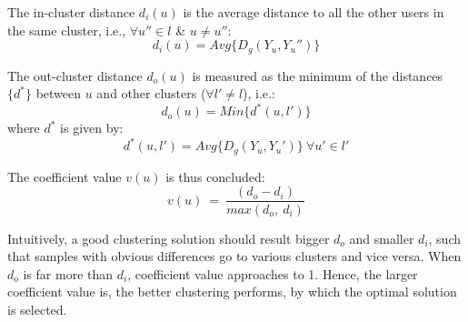 \begin{definition}
\label{def:di}
The in-cluster distance $d_i(u)$ is the average distance to all the other users in the same cluster, i.e., $\forall u'' \in l$ \& $u \neq u''$:
\begin{equation}
	d_i(u) = Avg\{D_g(Y_u, Y_u'')\}
\end{equation} 
\end{definition} 

\begin{definition}
\label{def:do}
The out-cluster distance $d_o(u)$ is measured as the minimum of the distances $\{d^{\ast}\}$ between $u$ and other clusters ($\forall l' \neq l$), i.e.:
\begin{equation}
	d_o(u) = Min\{d^{\ast}(u, l')\}
\end{equation}
where $d^{\ast}$ is given by:
\begin{equation}
	d^{\ast}(u, l') = Avg\{D_g(Y_u, Y_u')\}\ \forall u' \in l'
\end{equation}  
\end{definition}

\begin{definition}
\label{def:coef}
The coefficient value $v(u)$ is thus concluded:
\begin{equation}
\label{eq:coef}
v(u)\ =\ \frac{(d_o - d_i)}{max(d_o,\ d_i)}	
\end{equation}
\end{definition}

Intuitively, a good clustering solution should result bigger $d_o$ and smaller $d_i$, such that samples with obvious differences go to various clusters and vice versa.
When $d_o$ is far more than $d_i$, coefficient value approaches to 1.
Hence, the larger coefficient value is, the better clustering performs, by which the optimal solution is selected.






